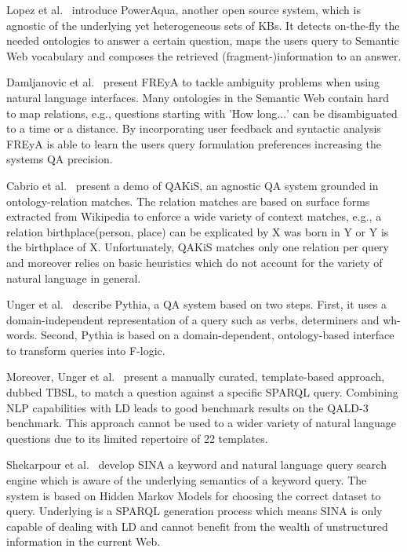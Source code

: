 {Lopez et al.~\cite{poweraqua}} introduce {PowerAqua}, another open source system, which is agnostic of the underlying yet heterogeneous sets of \ac{KB}s. 
It detects on-the-fly the needed ontologies to answer a certain question, maps the users query to Semantic Web vocabulary and composes the retrieved (fragment-)information to an answer. 

{Damljanovic et al.~\cite{freya}} present {FREyA} to tackle ambiguity problems when using natural language interfaces. 
Many ontologies in the Semantic Web contain hard to map relations, e.g., questions starting with 'How long$\ldots$' can be disambiguated to a time or a distance. 
By incorporating user feedback and syntactic analysis FREyA is able to learn the users query formulation preferences increasing the systems \ac{QA} precision. 

{Cabrio et al.~\cite{qakis}} present a demo of {QAKiS}, an agnostic \ac{QA} system grounded in ontology-relation matches. 
The relation matches are based on surface forms extracted from Wikipedia to enforce a wide variety of context matches, e.g., a relation birthplace(person, place) can be explicated by X was born in Y or Y is the birthplace of X. 
Unfortunately, QAKiS matches only one relation per query and moreover relies on basic heuristics which do not account for the variety of natural language in general.

{Unger et al.~\cite{pythia}} describe {Pythia}, a \ac{QA} system based on two steps.
First, it uses a domain-independent representation of a query such as verbs, determiners and wh-words.
Second, Pythia is based on a domain-dependent, ontology-based interface to transform queries into F-logic.


Moreover, Unger et al.~\cite{template} present a manually curated, template-based approach, dubbed {TBSL}, to match a question against a specific SPARQL query. 
Combining \ac{NLP} capabilities with \ac{LD} leads to good benchmark results on the \ac{QALD}-3 benchmark.
This approach cannot be used to a wider variety of natural language questions due to its limited repertoire of 22 templates.

{Shekarpour et al.~\cite{SINA_WebSemantic}} develop {SINA} a keyword and natural language query search engine which is aware of the underlying semantics of a keyword query. 
The system is based on Hidden Markov Models for choosing the correct dataset to query.
Underlying is a SPARQL generation process which means SINA is only capable of dealing with \ac{LD} and cannot benefit from the wealth of unstructured information in the current Web.


